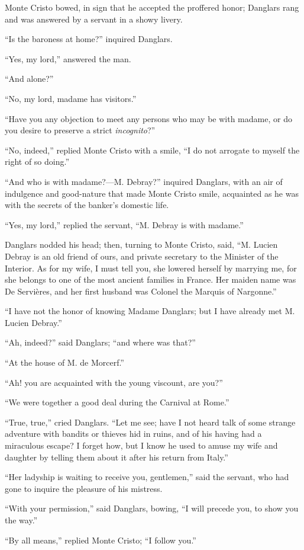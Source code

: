 Monte Cristo bowed, in sign that he accepted the proffered honor;
Danglars rang and was answered by a servant in a showy livery.

“Is the baroness at home?” inquired Danglars.

“Yes, my lord,” answered the man.

“And alone?”

“No, my lord, madame has visitors.”

“Have you any objection to meet any persons who may be with madame, or
do you desire to preserve a strict \textit{incognito}?”

“No, indeed,” replied Monte Cristo with a smile, “I do not arrogate to
myself the right of so doing.”

“And who is with madame?—M. Debray?” inquired Danglars, with an air of
indulgence and good-nature that made Monte Cristo smile, acquainted as
he was with the secrets of the banker’s domestic life.

“Yes, my lord,” replied the servant, “M. Debray is with madame.”

Danglars nodded his head; then, turning to Monte Cristo, said, “M.
Lucien Debray is an old friend of ours, and private secretary to the
Minister of the Interior. As for my wife, I must tell you, she lowered
herself by marrying me, for she belongs to one of the most ancient
families in France. Her maiden name was De Servières, and her first
husband was Colonel the Marquis of Nargonne.”

“I have not the honor of knowing Madame Danglars; but I have already
met M. Lucien Debray.”

“Ah, indeed?” said Danglars; “and where was that?”

“At the house of M. de Morcerf.”

“Ah! you are acquainted with the young viscount, are you?”

“We were together a good deal during the Carnival at Rome.”

“True, true,” cried Danglars. “Let me see; have I not heard talk of
some strange adventure with bandits or thieves hid in ruins, and of his
having had a miraculous escape? I forget how, but I know he used to
amuse my wife and daughter by telling them about it after his return
from Italy.”

“Her ladyship is waiting to receive you, gentlemen,” said the servant,
who had gone to inquire the pleasure of his mistress.

“With your permission,” said Danglars, bowing, “I will precede you, to
show you the way.”

“By all means,” replied Monte Cristo; “I follow you.”

